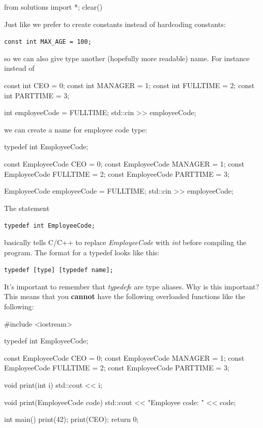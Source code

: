 \begin{python0}
from solutions import *; clear()
\end{python0}

Just like we prefer to create constants instead of hardcoding constants:

\verb!const int MAX_AGE = 100;!

so we can also give type another (hopefully more readable) name. For
instance instead of

\begin{consolethree}[escapeinside=||]
const int CEO = 0;
const int MANAGER = 1;
const int FULLTIME = 2;
const int PARTTIME = 3;

int employeeCode = FULLTIME;
std::cin >> employeeCode;
\end{consolethree}

we can create a name for employee code type:

\begin{consolethree}[escapeinside=||]
typedef int EmployeeCode;

const EmployeeCode CEO = 0;
const EmployeeCode MANAGER = 1;
const EmployeeCode FULLTIME = 2;
const EmployeeCode PARTTIME = 3;

EmployeeCode employeeCode = FULLTIME;
std::cin >> employeeCode;
\end{consolethree}

The statement

\verb!typedef int EmployeeCode;!

basically tells C/C++ to replace \textit{EmployeeCode} with \textit{int}
before compiling the program. The format for a typedef looks like this:

\verb!typedef [type] [typedef name];!


It's important to remember that \textit{typedef}s are type
aliases. Why is this important? This means that you \textbf{cannot} have
the following overloaded functions like the following:

\begin{consolethree}[escapeinside=||]
#include <iostream>

typedef int EmployeeCode;

const EmployeeCode CEO = 0;
const EmployeeCode MANAGER = 1;
const EmployeeCode FULLTIME = 2;
const EmployeeCode PARTTIME = 3;

void print(int i)
{
    std::cout << i;
}

void print(EmployeeCode code)
{
    std::cout << "Employee code: " << code;
}

int main()
{
    print(42);
    print(CEO);
    return 0;
}
\end{consolethree}

